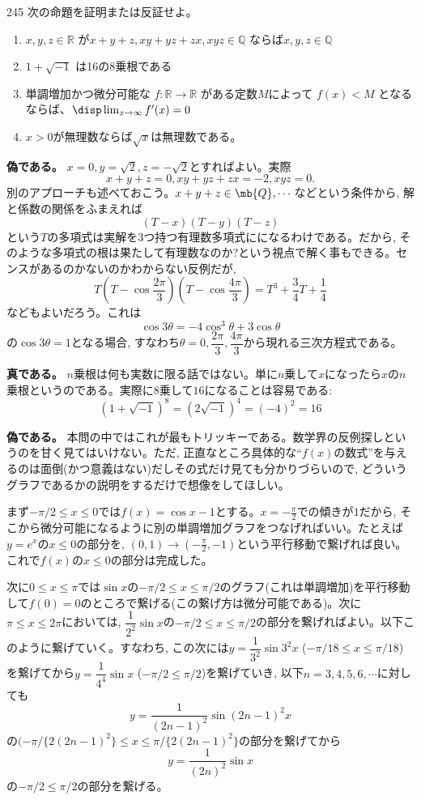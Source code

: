 \begin{prob}{245}{}{}
 次の命題を証明または反証せよ。
 \begin{enumerate}
  \item $x,y,z\in\mathbb{R}$ が$x+y+z,xy+yz+zx,xyz\in\mathbb{Q}$ ならば$x,y,z\in\mathbb{Q}$
  \item $1+\sqrt{-1}$ は16の8乗根である
  \item 単調増加かつ微分可能な $f:\mathbb{R}\rightarrow\mathbb{R}$ がある定数$M$によって $f(x)<M$ となるならば、$\disp \lim_{x\to\infty} f'(x)=0$
  \item $x>0$が無理数ならば$\sqrt{x}$は無理数である。
 \end{enumerate}
\end{prob}
\textbf{偽である。} $x=0, y=\sqrt{2}, z=-\sqrt{2}$とすればよい。実際
\[x+y+z = 0,  xy+yz+zx = -2, xyz = 0.\]
別のアプローチも述べておこう。$x+y+z\in \mb{Q},\cdots$などという条件から, 解と係数の関係をふまえれば
\[(T-x)(T-y)(T-z)\]
という$T$の多項式は実解を3つ持つ有理数多項式にになるわけである。だから, そのような多項式の根は果たして有理数なのか?という視点で解く事もできる。センスがあるのかないのかわからない反例だが,  
\[T(T-\cos{\dfrac{2\pi}{3}})(T-\cos{\dfrac{4\pi}{3}}) = T^3 + \dfrac{3}{4}T +\dfrac{1}{4}\]
などもよいだろう。これは
\[\cos{3\theta} = -4\cos^{3}{\theta} + 3\cos{\theta}\]
の$\cos{3\theta} = 1$となる場合, すなわち$\theta =0, \dfrac{2\pi}{3}, \dfrac{4\pi}{3}$から現れる三次方程式である。 

\textbf{真である。} $n$乗根は何も実数に限る話ではない。単に$n$乗して$x$になったら$x$の$n$乗根というのである。実際に8乗して$16$になることは容易である:
\[(1+\sqrt{-1})^8 = (2\sqrt{-1})^{4} = (-4)^2  = 16\]

\textbf{偽である。} 本問の中ではこれが最もトリッキーである。数学界の反例探しというのを甘く見てはいけない。ただ, 正直なところ具体的な``$f(x)$の数式''を与えるのは面倒(かつ意義はない)だしその式だけ見ても分かりづらいので, どういうグラフであるかの説明をするだけで想像をしてほしい。

まず$-\pi/2 \leq x\leq 0$では$f(x) = \cos{x} - 1$とする。$x=-\frac{\pi}{2}$での傾きが$1$だから, そこから微分可能になるように別の単調増加グラフをつなげればいい。たとえば$y=e^{x}$の$x\leq 0$の部分を, $(0,1)\to (-\frac{\pi}{2}, -1)$という平行移動で繋げれば良い。これで$f(x)$の$x\leq 0$の部分は完成した。

次に$0\leq x\leq \pi$では$\sin{x}$の$-\pi/2\leq x\leq \pi/2$のグラフ(これは単調増加)を平行移動して$f(0)=0$のところで繋げる(この繋げ方は微分可能である)。次に$\pi \leq x\leq 2\pi$においては, $\dfrac{1}{2^{2}}\sin{x}$の$-\pi/2\leq x\leq \pi/2$の部分を繋げればよい。以下このように繋げていく。すなわち, この次には$y=\dfrac{1}{3^{2}}\sin{3^2x}$ ($-\pi/18\leq x\leq\pi/18$)を繋げてから$y=\dfrac{1}{4^{4}}\sin{x}$ ($-\pi/2\leq \pi/2$)を繋げていき, 以下$n=3,4,5,6,\cdots$に対しても
\[y=\dfrac{1}{(2n-1)^2}\sin{(2n-1)^2x}\]
の$(-\pi/\{2(2n-1)^2\}\leq x\leq \pi/\{2(2n-1)^2\}$の部分を繋げてから
\[y=\dfrac{1}{(2n)^2}\sin{x}\]
の$-\pi/2\leq\pi/2$の部分を繋げる。

